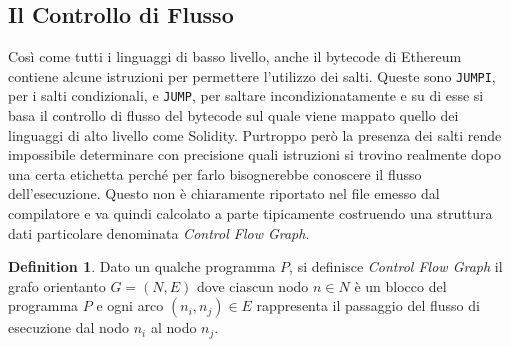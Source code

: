\documentclass[12pt,a4paper,openright,oneside]{report}
\theoremstyle{definition}
\newtheorem{definition}{Definition}
\begin{document}
\subsection{Il Controllo di Flusso}\label{impl:costs_attribution:control_flow}
Cos\`{i} come tutti i linguaggi di basso livello, anche il bytecode di Ethereum contiene alcune istruzioni per permettere l'utilizzo dei salti. Queste sono \texttt{JUMPI}, per i salti condizionali, e \texttt{JUMP}, per saltare incondizionatamente e su di esse si basa il controllo di flusso del bytecode sul quale viene mappato quello dei linguaggi di alto livello come Solidity. Purtroppo per\`{o} la presenza dei salti rende impossibile determinare con precisione quali istruzioni si trovino realmente dopo una certa etichetta perch\'{e} per farlo bisognerebbe conoscere il flusso dell'esecuzione. Questo non \`{e} chiaramente riportato nel file emesso dal compilatore e va quindi calcolato a parte tipicamente costruendo una struttura dati particolare denominata \textit{Control Flow Graph}.
\begin{definition}\label{def:cfg}
Dato un qualche programma $P$, si definisce \textit{Control Flow Graph} il grafo orientanto $G = (N,E)$ dove ciascun nodo $n \in N$ \`{e} un blocco del programma $P$ e ogni arco $(n_i,n_j) \in E$ rappresenta il passaggio del flusso di esecuzione dal nodo $n_i$ al nodo $n_j$.
\end{definition}
\end{document}
